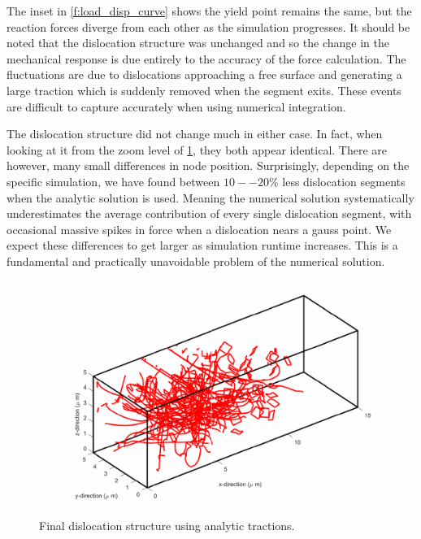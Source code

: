\documentclass[11pt]{iopart}
\begin{document}
The inset in \cref{f:load_disp_curve} shows the yield point remains the same, but the reaction forces diverge from each other as the simulation progresses. It should be noted that the dislocation structure was unchanged and so the change in the mechanical response is due entirely to the accuracy of the force calculation. The fluctuations are due to dislocations approaching a free surface and generating a large traction which is suddenly removed when the segment exits. These events are difficult to capture accurately when using numerical integration.

The dislocation structure did not change much in either case. In fact, when looking at it from the zoom level of \cref{f:dln_struc}, they both appear identical. There are however, many small differences in node position. Surprisingly, depending on the specific simulation, we have found between $10--20\%$ less dislocation segments when the analytic solution is used. Meaning the numerical solution systematically underestimates the average contribution of every single dislocation segment, with occasional massive spikes in force when a dislocation nears a gauss point. We expect these differences to get larger as simulation runtime increases. This is a fundamental and practically unavoidable problem of the numerical solution.

\begin{figure}[t]
    \centering
    \includegraphics[width=0.7\linewidth]{images/analytic_struct.pdf}
    \caption{Final dislocation structure using analytic tractions.}
    \label{f:dln_struc}
\end{figure}
\end{document}
